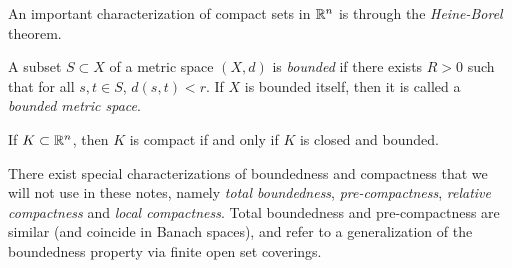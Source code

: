 An important characterization of compact sets in $\mathbb{R}^n$ is through the \emph{Heine-Borel} theorem.
\begin{definition}[Boundedness]
    A subset $S\subset X$ of a metric space $(X,d)$ is \emph{bounded} if there exists $R>0$ such that for all $s,t\in S$, $d(s,t)<r$. If $X$ is bounded itself, then it is called a \emph{bounded metric space}.
\end{definition}
\begin{theorem}
    If $K\subset\mathbb{R}^n$, then $K$ is compact if and only if $K$ is closed and bounded.  
\end{theorem}
There exist special characterizations of boundedness and compactness that we will not use in these notes, namely \emph{total boundedness}, \emph{pre-compactness}, \emph{relative compactness} and \emph{local compactness}. Total boundedness and pre-compactness are similar (and coincide in Banach spaces), and refer to a generalization of the boundedness property via finite open set coverings.

